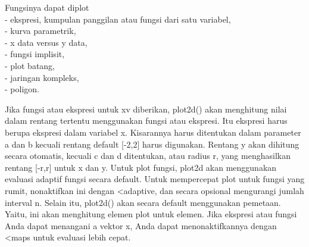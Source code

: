 \documentclass[a4paper,10pt]{article}
\begin{document}
\begin{eulernotebook}
\begin{eulercomment}
\begin{eulercomment}
\begin{eulercomment}
\begin{eulercomment}
\begin{eulercomment}
\begin{eulercomment}
\begin{eulercomment}
\begin{eulercomment}
\begin{eulercomment}
\begin{eulercomment}
\begin{eulercomment}
\begin{eulercomment}
\begin{eulercomment}
\begin{eulercomment}
\begin{eulercomment}
\begin{eulercomment}
\begin{eulercomment}
\begin{eulercomment}
\begin{eulercomment}
\begin{eulercomment}
\begin{eulercomment}
\begin{eulercomment}
\begin{eulercomment}
\begin{eulercomment}
\begin{eulercomment}
\begin{eulercomment}
\begin{eulercomment}
\begin{eulercomment}
\begin{eulercomment}
\begin{eulercomment}
\begin{eulercomment}
\begin{eulercomment}
\begin{eulercomment}
\begin{eulercomment}
\begin{eulercomment}
\begin{eulercomment}
\begin{eulercomment}
\begin{eulercomment}
\begin{eulercomment}
Fungsinya dapat diplot\\
- ekspresi, kumpulan panggilan atau fungsi dari satu variabel,\\
- kurva parametrik,\\
- x data versus y data,\\
- fungsi implisit,\\
- plot batang,\\
- jaringan kompleks,\\
- poligon.

Jika fungsi atau ekspresi untuk xv diberikan, plot2d() akan menghitung
nilai dalam rentang tertentu menggunakan fungsi atau ekspresi. Itu
ekspresi harus berupa ekspresi dalam variabel x. Kisarannya harus
ditentukan dalam parameter a dan b kecuali rentang default [-2,2]
harus digunakan. Rentang y akan dihitung secara otomatis, kecuali c
dan d ditentukan, atau radius r, yang menghasilkan rentang [-r,r]
untuk x dan y. Untuk plot fungsi, plot2d akan menggunakan evaluasi
adaptif fungsi secara default. Untuk mempercepat plot untuk fungsi
yang rumit, nonaktifkan ini dengan \textless{}adaptive, dan secara opsional
mengurangi jumlah interval n. Selain itu, plot2d() akan secara default
menggunakan pemetaan. Yaitu, ini akan menghitung elemen plot untuk
elemen. Jika ekspresi atau fungsi Anda dapat menangani a vektor x,
Anda dapat menonaktifkannya dengan \textless{}maps untuk evaluasi lebih cepat.


\end{eulercomment}
\end{eulercomment}
\end{eulercomment}
\end{eulercomment}
\end{eulercomment}
\end{eulercomment}
\end{eulercomment}
\end{eulercomment}
\end{eulercomment}
\end{eulercomment}
\end{eulercomment}
\end{eulercomment}
\end{eulercomment}
\end{eulercomment}
\end{eulercomment}
\end{eulercomment}
\end{eulercomment}
\end{eulercomment}
\end{eulercomment}
\end{eulercomment}
\end{eulercomment}
\end{eulercomment}
\end{eulercomment}
\end{eulercomment}
\end{eulercomment}
\end{eulercomment}
\end{eulercomment}
\end{eulercomment}
\end{eulercomment}
\end{eulercomment}
\end{eulercomment}
\end{eulercomment}
\end{eulercomment}
\end{eulercomment}
\end{eulercomment}
\end{eulercomment}
\end{eulercomment}
\end{eulercomment}
\end{eulercomment}
\end{eulernotebook}
\end{document}
